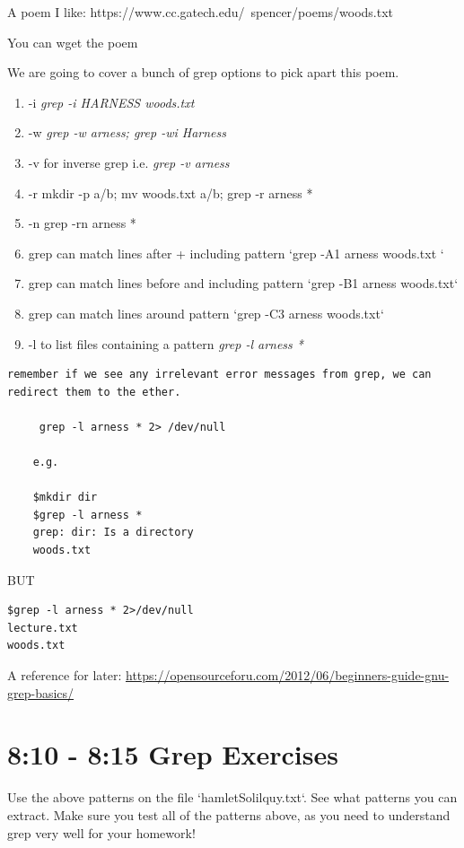 \documentclass[10pt]{article}
\begin{document}
A poem I like:
https://www.cc.gatech.edu/~spencer/poems/woods.txt

You can wget the poem

We are going to cover a bunch of grep options to pick apart this poem.

\begin{enumerate}
\item -i \textit{grep -i HARNESS woods.txt}
\item -w \textit{grep -w arness; grep -wi Harness} 
\item -v for inverse grep i.e. \textit{grep -v arness} 
\item -r mkdir -p a/b; mv woods.txt a/b; grep -r arness *
\item -n grep -rn arness *
\item grep can match lines after + including pattern `grep -A1 arness woods.txt `
\item grep can match lines before and including pattern  `grep -B1 arness woods.txt`
\item grep can match lines around pattern `grep -C3 arness woods.txt`
\item -l to list files containing a pattern \textit{ grep -l arness * }
\end{enumerate}

\begin{verbatim}
remember if we see any irrelevant error messages from grep, we can redirect them to the ether.

     grep -l arness * 2> /dev/null

    e.g.
    
	$mkdir dir
    $grep -l arness *
    grep: dir: Is a directory
    woods.txt
\end{verbatim}   
 
    BUT

\begin{lstlisting}[style=term]    
$grep -l arness * 2>/dev/null
lecture.txt
woods.txt
\end{lstlisting}

A reference for later:
\url{https://opensourceforu.com/2012/06/beginners-guide-gnu-grep-basics/}

\section{8:10 - 8:15 Grep Exercises}
 
Use the above patterns on the file `hamletSolilquy.txt`. See what patterns you can extract. Make sure you test all of the patterns above, as you need to understand grep very well for your homework!
\end{document}
